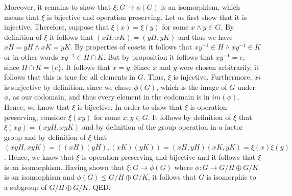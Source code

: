 \documentclass{article}
\newcommand{\and}{\wedge}
\begin{document}
Moreover, it remains to show that $\xi: G \rightarrow \phi(G)$ is an isomorphism, which means that $\xi$ is bijective and operation preserving. Let us first show that it is injective. Therefore, suppose that $\xi(x)=\xi(y)$ for some $x \and y \in G$. By definition of $\xi$ it follows that $(xH, xK)=(yH, yK)$ and thus we have $xH=yH \and xK=yK$. By properties of cosets it follows that $xy^{-1} \in H \and xy^{-1} \in K$ or in other words $xy^{-1} \in H \cap K$. But by proposition it follows that $xy^{-1} = e$, since $H \cap K = \{e\}$. It follows that $x=y$. Since $x$ and $y$ were chosen arbitrarily, it follows that this is true for all elements in $G$. Thus, $\xi$ is injective. Furthermore, $xi$ is surjective by definition, since we chose $\phi(G)$, which is the image of $G$ under $\phi$, as our codomain, and thus every element in the codomain is in $im(\phi)$. Hence, we know that $\xi$ is bijective. In order to show that $\xi$ is operation preserving, consider $\xi(xy)$ for some $x, y \in G$. It follows by definition of $\xi$ that $\xi(xy)=(xyH, xyK)$ and by definition of the group operation in a factor group and by definition of $\xi$ that $(xyH, xyK)=((xH)(yH), (xK)(yK))=(xH, yH)(xK, yK)=\xi(x)\xi(y)$. Hence, we know that $\xi$ is operation preserving and bijective and it follows that $\xi$ is an isomorphism. Having shown that $\xi: G \rightarrow \phi(G)$ where $\phi: G\rightarrow G/H\oplus G/K$ is an isomorphism and $\phi(G) \leq G/H\oplus G/K$, it follows that $G$ is isomorphic to a subgroup of $G/H \oplus G/K$. QED.\\
\end{document}
